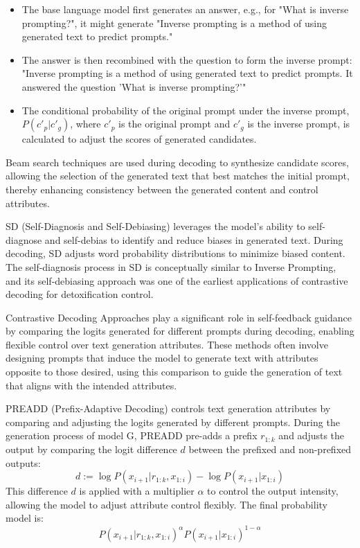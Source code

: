 \documentclass[acmsmall, screen]{acmart}
\begin{document}
\begin{itemize}
    \item The base language model first generates an answer, e.g., for "What is inverse prompting?", it might generate "Inverse prompting is a method of using generated text to predict prompts."
    \item The answer is then recombined with the question to form the inverse prompt: "Inverse prompting is a method of using generated text to predict prompts. It answered the question 'What is inverse prompting?'"
    \item The conditional probability of the original prompt under the inverse prompt, \(P(c'_p | c'_g)\), where \(c'_p\) is the original prompt and \(c'_g\) is the inverse prompt, is calculated to adjust the scores of generated candidates.
\end{itemize}

Beam search techniques are used during decoding to synthesize candidate scores, allowing the selection of the generated text that best matches the initial prompt, thereby enhancing consistency between the generated content and control attributes.

SD (Self-Diagnosis and Self-Debiasing) \cite{schick_tacl21_SD} leverages the model's ability to self-diagnose and self-debias to identify and reduce biases in generated text. During decoding, SD adjusts word probability distributions to minimize biased content. The self-diagnosis process in SD is conceptually similar to Inverse Prompting, and its self-debiasing approach was one of the earliest applications of contrastive decoding for detoxification control.

Contrastive Decoding Approaches play a significant role in self-feedback guidance by comparing the logits generated for different prompts during decoding, enabling flexible control over text generation attributes. These methods often involve designing prompts that induce the model to generate text with attributes opposite to those desired, using this comparison to guide the generation of text that aligns with the intended attributes.

PREADD (Prefix-Adaptive Decoding) \cite{pei_acl23_PREADD} controls text generation attributes by comparing and adjusting the logits generated by different prompts. During the generation process of model G, PREADD pre-adds a prefix \( r_{1:k} \) and adjusts the output by comparing the logit difference \( d \) between the prefixed and non-prefixed outputs:
\begin{equation}
d := \log P(x_{i+1} | r_{1:k}, x_{1:i}) - \log P(x_{i+1} | x_{1:i})
\end{equation}
This difference \( d \) is applied with a multiplier \( \alpha \) to control the output intensity, allowing the model to adjust attribute control flexibly. The final probability model is:
\begin{equation}
P(x_{i+1} | r_{1:k}, x_{1:i})^\alpha P(x_{i+1} | x_{1:i})^{1-\alpha}
\end{equation}
\end{document}

